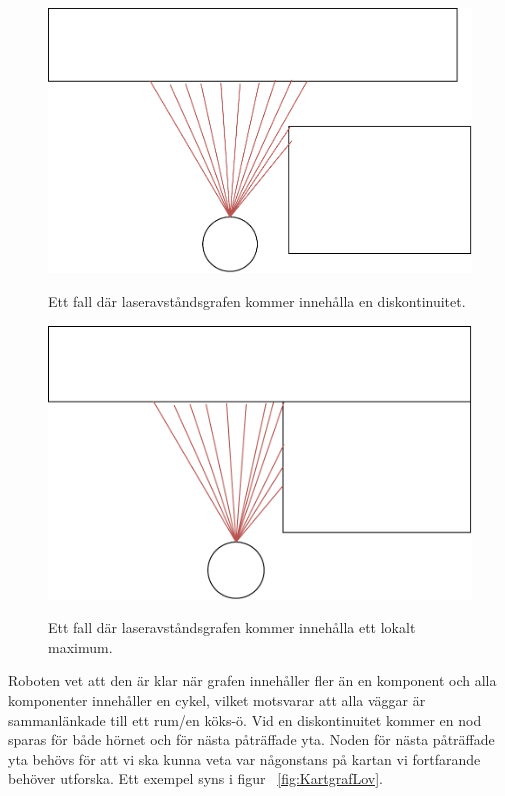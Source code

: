 \documentclass{article}
\begin{document}
\begin{figure}[H]
  \centering
  \includegraphics[scale=0.5,keepaspectratio]{LaserDiskontinuitet} \\
  \caption{Ett fall där laseravståndsgrafen kommer innehålla en diskontinuitet.}
  \label{fig:LaserDiskontinuitet}
\end{figure}

\begin{figure}[H]
  \centering
  \includegraphics[scale=0.5]{LaserLokaltMaximum} \\
  \caption{Ett fall där laseravståndsgrafen kommer innehålla ett lokalt maximum.}
  \label{fig:LaserLokaltMaximum}
\end{figure}

Roboten vet att den är klar när grafen innehåller fler än en komponent och alla komponenter innehåller en cykel, vilket motsvarar att alla väggar är sammanlänkade till ett rum/en köks-ö. Vid en diskontinuitet kommer en nod sparas för både hörnet och för nästa påträffade yta. Noden för nästa påträffade yta behövs för att vi ska kunna veta var någonstans på kartan vi fortfarande behöver utforska. Ett exempel syns i figur  ~\ref{fig:KartgrafLov}.
\end{document}
